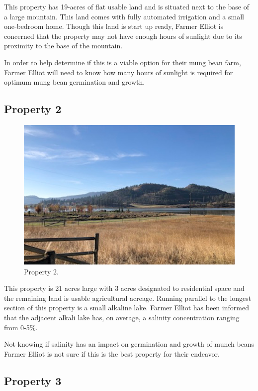 \documentclass[
]{book}
\begin{document}
This property has 19-acres of flat usable land and is situated next to the base of a large mountain. This land comes with fully automated irrigation and a small one-bedroom home. Though this land is start up ready, Farmer Elliot is concerned that the property may not have enough hours of sunlight due to its proximity to the base of the mountain.

In order to help determine if this is a viable option for their mung bean farm, Farmer Elliot will need to know how many hours of sunlight is required for optimum mung bean germination and growth.

\hypertarget{property-2}{%
\subsection*{Property 2}\label{property-2}}

\begin{figure}
\centering
\includegraphics{images/prop-2.png}
\caption{Property 2.}
\end{figure}

This property is 21 acres large with 3 acres designated to residential space and the remaining land is usable agricultural acreage. Running parallel to the longest section of this property is a small alkaline lake. Farmer Elliot has been informed that the adjacent alkali lake has, on average, a salinity concentration ranging from 0-5\%.

Not knowing if salinity has an impact on germination and growth of munch beans Farmer Elliot is not sure if this is the best property for their endeavor.

\hypertarget{property-3}{%
\subsection*{Property 3}\label{property-3}}
\end{document}
